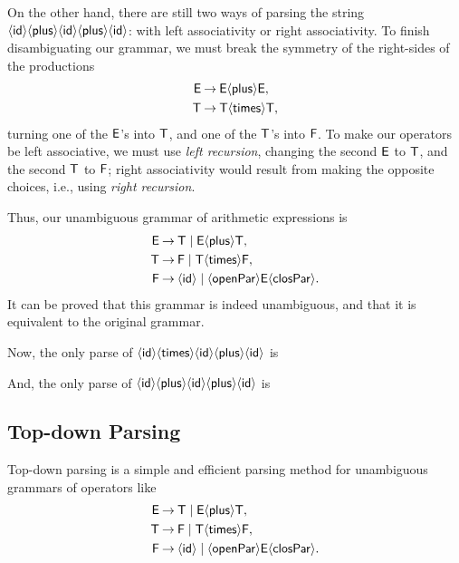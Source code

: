On the other hand, there are still two ways of parsing the string
$\idsym\plussym\idsym\plussym\idsym$: with left associativity or right
associativity.  To finish disambiguating our grammar, we must break
the symmetry of the right-sides of the productions
\begin{align*}
  \Esf &\fun \Esf\plussym\Esf , \\
  \Tsf &\fun \Tsf\timessym\Tsf ,
\end{align*}
turning one of the $\Esf$'s into $\Tsf$, and one of the $\Tsf$'s into
$\Fsf$.  To make our operators be left associative, we must use
\emph{left recursion}, changing the second $\Esf$ to $\Tsf$, and the
second $\Tsf$ to $\Fsf$; right associativity would result from making
the opposite choices, i.e., using \emph{right recursion}.

Thus, our unambiguous grammar of arithmetic expressions is
\begin{align*}
\Esf &\fun \Tsf \mid \Esf\plussym\Tsf , \\
\Tsf &\fun \Fsf \mid \Tsf\timessym\Fsf , \\
\Fsf &\fun \idsym \mid \openparsym\Esf\closparsym .
\end{align*}
It can be proved that this grammar is indeed unambiguous, and that it
is equivalent to the original grammar.

Now, the only parse of $\idsym\timessym\idsym\plussym\idsym$ is
\begin{center}

\end{center}
And, the only parse of $\idsym\plussym\idsym\plussym\idsym$
is
\begin{center}

\end{center}

\subsection{Top-down Parsing}

Top-down parsing is a simple and efficient parsing method for
unambiguous grammars of operators like
\begin{align*}
\Esf &\fun \Tsf \mid \Esf\plussym\Tsf , \\
\Tsf &\fun \Fsf \mid \Tsf\timessym\Fsf , \\
\Fsf &\fun \idsym \mid \openparsym\Esf\closparsym .
\end{align*}

